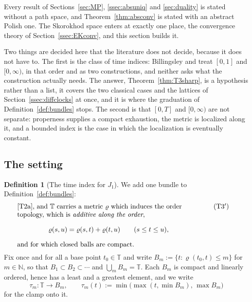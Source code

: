 \documentclass[11pt,a4paper]{article}
\theoremstyle{plain}
\theoremstyle{definition}
\newtheorem{definition}[theorem]{Definition}
\theoremstyle{remark}
\newcommand{\N}{\mathbb{N}}
\newcommand{\T}{\mathbb{T}}                     %
\newcommand{\EK}{\cite{EK86}}
\begin{document}
Every result of Sections~\ref{sec:MP}, \ref{ssec:absuniq} and \ref{sec:duality}
is stated without a path space, and Theorem~\ref{thm:absconv} is stated with an
abstract Polish one.  The Skorokhod space enters at exactly one place, the
convergence theory of Section~\ref{ssec:EKconv}, and this section builds it.

Two things are decided here that the literature does not decide, because it does
not have to.  The first is the class of time indices: Billingsley and \EK{} treat
$[0,1]$ and $[0,\infty)$, in that order and as two constructions, and neither
asks what the construction actually needs.  The answer, Theorem~\ref{thm:T3sharp},
is a hypothesis rather than a list, it covers the two classical cases and the
lattices of Section~\ref{ssec:diffclocks} at once, and it is where the graduation
of Definition~\ref{def:bundles} stops.  The second is that $[0,T]$ and
$[0,\infty)$ are not separate: properness supplies a compact exhaustion, the
metric is localized along it, and a bounded index is the case in which the
localization is eventually constant.

\subsection{The setting}
\label{ssec:skorokhodsetting}

\begin{definition}[The time index for $J_1$]
  \label{def:T3prime}
  We add one bundle to Definition~\ref{def:bundles}:
  \begin{align}
    &\parbox[t]{0.78\textwidth}{\raggedright
      \eqref{T2a}, and $\T$ carries a metric $\varrho$ which induces the order
      topology, which is \emph{additive along the order},
      \[
        \varrho(s,u) = \varrho(s,t) + \varrho(t,u) \qquad (s \leq t \leq u),
      \]
      and for which closed balls are compact.}
      \tag{T3$'$}\label{T3p}
  \end{align}
  Fix once and for all a base point $t_0 \in \T$ and write
  $B_m := \{t : \varrho(t_0,t) \leq m\}$ for $m \in \N$, so that
  $B_1 \subset B_2 \subset \cdots$ and $\bigcup_m B_m = \T$.  Each $B_m$ is
  compact and linearly ordered, hence has a least and a greatest element, and we
  write
  \[
    \tau_m : \T \to B_m, \qquad
    \tau_m(t) := \min\bigl(\max(t, \min B_m),\, \max B_m\bigr)
  \]
  for the clamp onto it.
\end{definition}
\end{document}
